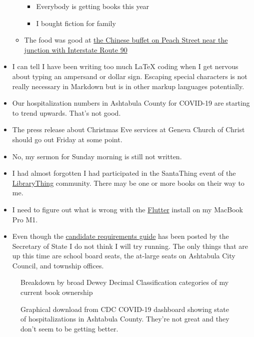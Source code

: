 \begin{itemize}
\begin{itemize}
    \begin{itemize}
    \tightlist
    \item
      Everybody is getting books this year
    \item
      I bought fiction for family
    \end{itemize}
  \item
    The food was good at \href{https://www.sssuperbuffet.com/}{the
    Chinese buffet on Peach Street near the junction with Interstate
    Route 90}
  \end{itemize}
\item
  I can tell I have been writing too much LaTeX coding when I get
  nervous about typing an ampersand or dollar sign. Escaping special
  characters is not really necessary in Markdown but is in other markup
  languages potentially.
\item
  Our hospitalization numbers in Ashtabula County for COVID-19 are
  starting to trend upwards. That's not good.
\item
  The press release about Christmas Eve services at Geneva Church of
  Christ should go out Friday at some point.
\item
  No, my sermon for Sunday morning is still not written.
\item
  I had almost forgotten I had participated in the SantaThing event of
  the \href{https://www.librarything.com/}{LibraryThing} community.
  There may be one or more books on their way to me.
\item
  I need to figure out what is wrong with the
  \href{https://flutter.dev}{Flutter} install on my MacBook Pro M1.
\item
  Even though the
  \href{https://www.ohiosos.gov/globalassets/publications/election/2023_crg.pdf}{candidate
  requirements guide} has been posted by the Secretary of State I do not
  think I will try running. The only things that are up this time are
  school board seats, the at-large seats on Ashtabula City Council, and
  township offices.
\end{itemize}

\begin{figure}
\centering
{}
\caption{Breakdown by broad Dewey Decimal Classification categories of
my current book ownership}
\end{figure}

\begin{figure}
\centering
{}
\caption{Graphical download from CDC COVID-19 dashboard showing state of
hospitalizations in Ashtabula County. They're not great and they don't
seem to be getting better.}
\end{figure}
